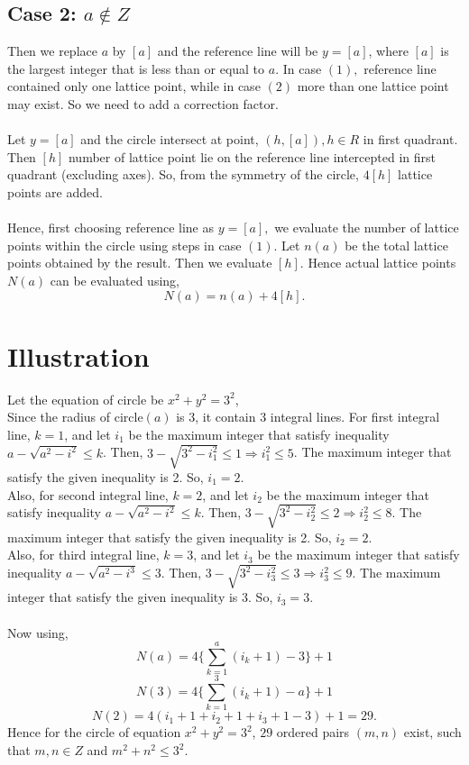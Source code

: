 \documentclass[journal,twoside]{IEEEtran}
\begin{document}
\subsection{Case 2: $a \notin Z$}
Then we replace $a$ by $[a]$ and the reference line will be $y=[a]$, where $[a]$ is the largest integer that is less than or equal to $a$. In case $(1),$ reference line contained only one lattice point, while in case $(2)$ more than one lattice point may exist. So we need to add a correction factor.
\\\\
Let $y=[a]$ and the circle intersect at point, $(h,[a]),h \in R$ in first quadrant. Then $[h]$ number of lattice point lie on the reference line intercepted in first quadrant (excluding axes). So, from the symmetry of the circle, $4[h]$ lattice points are added.
\\\\Hence, first choosing reference line as $y=[a],$ we evaluate the number of lattice points within the circle using steps in case $(1).$ Let $n(a)$ be the total lattice points obtained by the result. Then we evaluate $[h].$ Hence actual lattice points $N(a)$ can be evaluated using, $$N(a)=n(a)+4[h].$$



\section{Illustration}
Let the equation of circle be $x^{2}+y^{2}=3^{2}$,
\\Since the radius of circle$(a)$ is 3, it contain 3 integral lines. For first integral line, $k=1$, and let $i_{1}$ be the maximum integer that satisfy inequality $a- \sqrt{a^{2}-i^{2}} \leq k$. Then, $3- \sqrt{3^{2}-i_{1}^{2}} \leq 1 \Rightarrow i_{1}^{2} \leq 5 $. The maximum integer that satisfy the given inequality is 2. So, $i_{1}=2$.
\\Also, for second integral line, $k=2$, and let $i_{2}$ be the maximum integer that satisfy inequality $a- \sqrt{a^{2}-i^{2}} \leq k$. Then, $3- \sqrt{3^{2}-i_{2}^{2}} \leq 2 \Rightarrow i_{2}^{2} \leq 8 $. The maximum integer that satisfy the given inequality is 2. So, $i_{2}=2$.
\\Also, for third integral line, $k=3$, and let $i_{3}$ be the maximum integer that satisfy inequality $a- \sqrt{a^{2}-i^{3}} \leq 3$. Then, $3- \sqrt{3^{2}-i_{3}^{2}} \leq 3 \Rightarrow i_{3}^{2} \leq 9 $. The maximum integer that satisfy the given inequality is 3. So, $i_{3}=3$.
\\\\Now using, $$N(a)=4\bigg\{\sum_{k=1}^{a}(i_{k}+1)-3\bigg\}+1$$
$$N(3)=4\bigg\{\sum_{k=1}^{3}(i_{k}+1)-a\bigg\}+1$$
$$N(2)=4(i_{1}+1+i_{2}+1+i_{3}+1-3)+1= 29.$$
Hence for the circle of equation $x^{2}+y^{2}=3^{2}$, $29$ ordered pairs $(m,n)$ exist, such that $m,n \in Z$ and $m^{2}+n^{2} \leq 3^{2}$.
\end{document}

